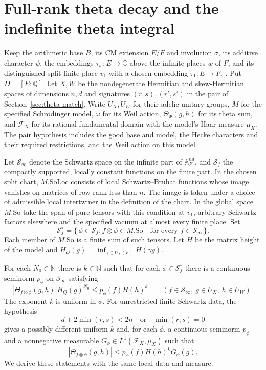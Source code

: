 \section{Full-rank theta decay and the indefinite theta integral}
\label{sec:theta-decay-proof}

Keep the arithmetic base \(B\), its CM extension \(E/F\) and involution
\(\sigma\), its additive character \(\psi\), the embeddings
\(\tau_w:E\to\mathbb C\) above the infinite places \(w\) of \(F\), and
its distinguished split finite place \(v_1\) with a chosen embedding
\(\tau_1:E\to F_{v_1}\). Put \(D=[E:\mathbb Q]\).
Let \(X,W\) be the nondegenerate Hermitian and skew-Hermitian spaces
of dimensions \(n,d\) and signatures \((r,s),(r',s')\) in the pair
of Section~\ref{sec:theta-match}. Write \(U_X,U_W\) for their adelic
unitary groups, \(M\) for the specified Schr\"odinger model,
\(\omega\) for its Weil action, \(\Theta_\Phi(g,h)\) for its theta
sum, and \(\mathcal F_X\) for its rational fundamental domain with
the model's Haar measure \(\mu_X\). The pair hypothesis includes the
good base and model, the Hecke characters and their required restrictions,
and the Weil action on this model.

Let \(\mathcal S_\infty\) denote the Schwartz space on the infinite
part of \(\mathbb A_F^{nd}\), and \(\mathcal S_f\) the compactly
supported, locally constant functions on the finite part. In the
chosen split chart, \(M.\mathrm{SoLoc}\) consists of local
Schwartz--Bruhat functions whose image vanishes on matrices of row
rank less than \(n\). The image is taken under a choice of admissible local
intertwiner in the definition of the chart. In the global space
\(M.\mathrm{So}\) take the span of pure tensors with this condition at
\(v_1\), arbitrary Schwartz factors elsewhere and the specified
vacuum at almost every finite place. Set
\[
 \mathcal S_f^\circ=
 \{\,\phi\in\mathcal S_f:
          f\otimes\phi\in M.\mathrm{So}\quad
               \text{for every } f\in\mathcal S_\infty\,\}.
\]
Each member of \(M.\mathrm{So}\) is a finite sum of such tensors.
Let \(H\) be the matrix height of the model and
\(H_Q(g)=\inf_{\gamma\in U_X(F)}H(\gamma g)\).

For each \(N_0\in\mathbb N\) there is \(k\in\mathbb N\) such that
for each \(\phi\in\mathcal S_f^\circ\) there is a continuous seminorm
\(p_\phi\) on \(\mathcal S_\infty\) satisfying
\begin{equation}
 |\Theta_{f\otimes\phi}(g,h)|H_Q(g)^{N_0}
       \le p_\phi(f) H(h)^k
 \qquad(f\in\mathcal S_\infty,\ g\in U_X,\ h\in U_W).
 \label{eq:theta-full-decay}
\end{equation}
The exponent \(k\) is uniform in \(\phi\). For unrestricted finite
Schwartz data, the hypothesis
\begin{equation}
 d+2\min(r,s)<2n\quad\text{or}\quad\min(r,s)=0
 \label{eq:theta-weil-range}
\end{equation}
gives a possibly different uniform \(k\) and, for each \(\phi\),
a continuous seminorm \(p_\phi\) and a nonnegative measurable
\(G_\phi\in L^1(\mathcal F_X,\mu_X)\) such that
\[
 |\Theta_{f\otimes\phi}(g,h)|
       \le p_\phi(f)H(h)^kG_\phi(g).
\]
We derive these statements with the same local data and measure.

